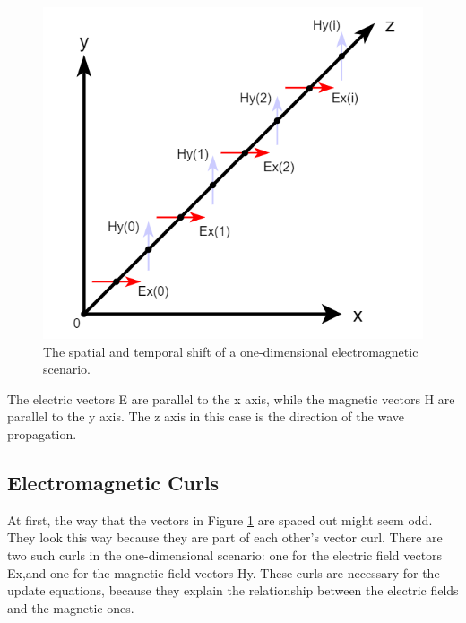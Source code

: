 \begin{figure}
	\centering
	\includegraphics[scale=0.5]{Figures/fdtd1dDiscretized}
	\decoRule
	\caption[1D Spatial and Temporal Shift - TEM Mode]{The spatial and temporal shift of a one-dimensional electromagnetic scenario.}
	\label{fig:fdtd1dDiscretized}
\end{figure}

The electric vectors E are parallel to the x axis, while the magnetic vectors H are parallel to the y axis. The z axis in this case is the direction of the wave propagation.


\subsection{Electromagnetic Curls}

At first, the way that the vectors in Figure \ref{fig:fdtd1dDiscretized} are spaced out might seem odd. They look this way because they are part of each other's vector curl. There are two such curls in the one-dimensional scenario: one for the electric field vectors Ex,and one for the magnetic field vectors Hy. These curls are necessary for the update equations, because they explain the relationship between the electric fields and the magnetic ones.

